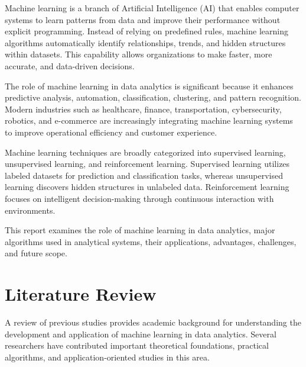 \documentclass[11pt,a4paper]{article}
\begin{document}
Machine learning is a branch of Artificial Intelligence (AI) that enables computer systems to learn patterns from data and improve their performance without explicit programming. Instead of relying on predefined rules, machine learning algorithms automatically identify relationships, trends, and hidden structures within datasets. This capability allows organizations to make faster, more accurate, and data-driven decisions.

The role of machine learning in data analytics is significant because it enhances predictive analysis, automation, classification, clustering, and pattern recognition. Modern industries such as healthcare, finance, transportation, cybersecurity, robotics, and e-commerce are increasingly integrating machine learning systems to improve operational efficiency and customer experience.

Machine learning techniques are broadly categorized into supervised learning, unsupervised learning, and reinforcement learning. Supervised learning utilizes labeled datasets for prediction and classification tasks, whereas unsupervised learning discovers hidden structures in unlabeled data. Reinforcement learning focuses on intelligent decision-making through continuous interaction with environments.

This report examines the role of machine learning in data analytics, major algorithms used in analytical systems, their applications, advantages, challenges, and future scope.


\section{Literature Review}

A review of previous studies provides academic background for understanding the development and application of machine learning in data analytics. Several researchers have contributed important theoretical foundations, practical algorithms, and application-oriented studies in this area.
\end{document}
